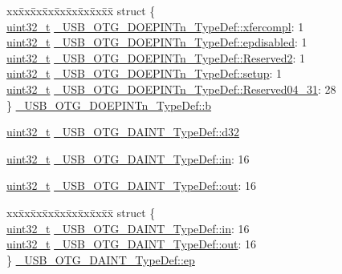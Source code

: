 \begin{DoxyCompactItemize}
\begin{tabbing}
xx\=xx\=xx\=xx\=xx\=xx\=xx\=xx\=xx\=\kill
struct \{\\
\>\hyperlink{stdint_8h_a435d1572bf3f880d55459d9805097f62}{uint32\_t} \hyperlink{group___u_s_b___o_t_g___d_r_i_v_e_r_gaaca4cf95c7b4adf7ca9ec0895ba5360d}{\_USB\_OTG\_DOEPINTn\_TypeDef::xfercompl}: 1\\
\>\hyperlink{stdint_8h_a435d1572bf3f880d55459d9805097f62}{uint32\_t} \hyperlink{group___u_s_b___o_t_g___d_r_i_v_e_r_ga8fa33d9d00b0398bb9cffbeef8ed78a9}{\_USB\_OTG\_DOEPINTn\_TypeDef::epdisabled}: 1\\
\>\hyperlink{stdint_8h_a435d1572bf3f880d55459d9805097f62}{uint32\_t} \hyperlink{group___u_s_b___o_t_g___d_r_i_v_e_r_ga9032caa3217578a7f7660b1b5489fea7}{\_USB\_OTG\_DOEPINTn\_TypeDef::Reserved2}: 1\\
\>\hyperlink{stdint_8h_a435d1572bf3f880d55459d9805097f62}{uint32\_t} \hyperlink{group___u_s_b___o_t_g___d_r_i_v_e_r_ga1fcadb3c98fdf26e6e29a2ee7611ee01}{\_USB\_OTG\_DOEPINTn\_TypeDef::setup}: 1\\
\>\hyperlink{stdint_8h_a435d1572bf3f880d55459d9805097f62}{uint32\_t} \hyperlink{group___u_s_b___o_t_g___d_r_i_v_e_r_gaf42d3169ce0fb063fbccbbc7ad0efd57}{\_USB\_OTG\_DOEPINTn\_TypeDef::Reserved04\_31}: 28\\
\} \hyperlink{group___u_s_b___o_t_g___d_r_i_v_e_r_ga65eb652509ab57b76a58d01d894ceba2}{\_USB\_OTG\_DOEPINTn\_TypeDef::b}\\

\end{tabbing}\item 
\hyperlink{stdint_8h_a435d1572bf3f880d55459d9805097f62}{uint32\-\_\-t} \hyperlink{group___u_s_b___o_t_g___d_r_i_v_e_r_gad342406e081a08b2f1ef61a8144b732e}{\-\_\-\-U\-S\-B\-\_\-\-O\-T\-G\-\_\-\-D\-A\-I\-N\-T\-\_\-\-Type\-Def\-::d32}
\item 
\hyperlink{stdint_8h_a435d1572bf3f880d55459d9805097f62}{uint32\-\_\-t} \hyperlink{group___u_s_b___o_t_g___d_r_i_v_e_r_ga95218036397e28b27ccde01eaf9bd063}{\-\_\-\-U\-S\-B\-\_\-\-O\-T\-G\-\_\-\-D\-A\-I\-N\-T\-\_\-\-Type\-Def\-::in}\-: 16
\item 
\hyperlink{stdint_8h_a435d1572bf3f880d55459d9805097f62}{uint32\-\_\-t} \hyperlink{group___u_s_b___o_t_g___d_r_i_v_e_r_ga60a84be2a00058a3ed7c410e909322af}{\-\_\-\-U\-S\-B\-\_\-\-O\-T\-G\-\_\-\-D\-A\-I\-N\-T\-\_\-\-Type\-Def\-::out}\-: 16
\item 
\begin{tabbing}
xx\=xx\=xx\=xx\=xx\=xx\=xx\=xx\=xx\=\kill
struct \{\\
\>\hyperlink{stdint_8h_a435d1572bf3f880d55459d9805097f62}{uint32\_t} \hyperlink{group___u_s_b___o_t_g___d_r_i_v_e_r_ga95218036397e28b27ccde01eaf9bd063}{\_USB\_OTG\_DAINT\_TypeDef::in}: 16\\
\>\hyperlink{stdint_8h_a435d1572bf3f880d55459d9805097f62}{uint32\_t} \hyperlink{group___u_s_b___o_t_g___d_r_i_v_e_r_ga60a84be2a00058a3ed7c410e909322af}{\_USB\_OTG\_DAINT\_TypeDef::out}: 16\\
\} \hyperlink{group___u_s_b___o_t_g___d_r_i_v_e_r_ga28342af4664393bab0bcdbfcd15ac1c4}{\_USB\_OTG\_DAINT\_TypeDef::ep}\\


\end{tabbing}
\end{DoxyCompactItemize}
